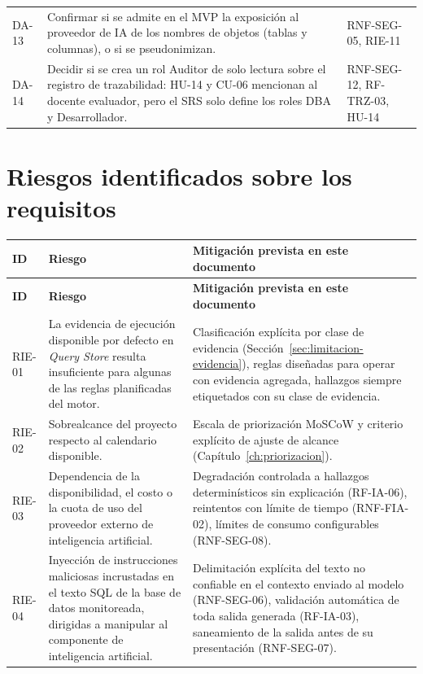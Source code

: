 \documentclass[11pt,a4paper]{report}
\begin{document}
\begin{xltabular}{\linewidth}{@{}p{1.3cm}Xp{2.6cm}@{}}
DA-13 & Confirmar si se admite en el MVP la exposici\'on al proveedor de IA de los nombres de objetos (tablas y columnas), o si se pseudonimizan. & RNF-SEG-05, RIE-11 \\
DA-14 & Decidir si se crea un rol Auditor de solo lectura sobre el registro de trazabilidad: HU-14 y CU-06 mencionan al docente evaluador, pero el SRS solo define los roles DBA y Desarrollador. & RNF-SEG-12, RF-TRZ-03, HU-14 \\
\end{xltabular}

\section{Riesgos identificados sobre los requisitos}

\begin{xltabular}{\linewidth}{@{}p{1.3cm}p{4.3cm}X@{}}
\toprule
\textbf{ID} & \textbf{Riesgo} & \textbf{Mitigaci\'on prevista en este documento} \\
\midrule
\endfirsthead
\toprule
\textbf{ID} & \textbf{Riesgo} & \textbf{Mitigaci\'on prevista en este documento} \\
\midrule
\endhead
\bottomrule
\endlastfoot
RIE-01 & La evidencia de ejecuci\'on disponible por defecto en \textit{Query Store} resulta insuficiente para algunas de las reglas planificadas del motor. & Clasificaci\'on expl\'icita por clase de evidencia (Secci\'on~\ref{sec:limitacion-evidencia}), reglas dise\~nadas para operar con evidencia agregada, hallazgos siempre etiquetados con su clase de evidencia. \\
RIE-02 & Sobrealcance del proyecto respecto al calendario disponible. & Escala de priorizaci\'on MoSCoW y criterio expl\'icito de ajuste de alcance (Cap\'itulo~\ref{ch:priorizacion}). \\
RIE-03 & Dependencia de la disponibilidad, el costo o la cuota de uso del proveedor externo de inteligencia artificial. & Degradaci\'on controlada a hallazgos determin\'isticos sin explicaci\'on (RF-IA-06), reintentos con l\'imite de tiempo (RNF-FIA-02), l\'imites de consumo configurables (RNF-SEG-08). \\
RIE-04 & Inyecci\'on de instrucciones maliciosas incrustadas en el texto SQL de la base de datos monitoreada, dirigidas a manipular al componente de inteligencia artificial. & Delimitaci\'on expl\'icita del texto no confiable en el contexto enviado al modelo (RNF-SEG-06), validaci\'on autom\'atica de toda salida generada (RF-IA-03), saneamiento de la salida antes de su presentaci\'on (RNF-SEG-07). \\

\end{xltabular}
\end{document}
